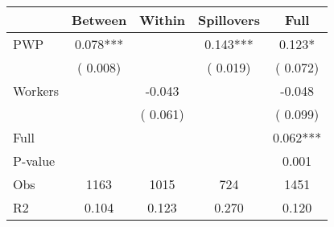
\begin{tabular}{l*{4}{c}}\hline&\multicolumn{1}{c}{Between}&\multicolumn{1}{c}{Within}&\multicolumn{1}{c}{Spillovers}&\multicolumn{1}{c}{Full}\\ \hline
 PWP           &              0.078***      &                                               &        0.143*** &         0.123*                            \\ 
                               &        (       0.008)           &                                       &       (       0.019)     &      (       0.072)                                           \\ 
 Workers       &                                               &       -0.043    &                                &            -0.048                            \\ 
                               &                                               & (       0.061)                  &                                        &      (       0.099)                                           \\ 
\hline                                                                                                                                                                                                                                            
 Full                  &                                               &                                               &                                        &             0.062***                                     \\ 
 P-value               &                                               &                                               &                                        &             0.001                                           \\ 
 Obs                   &               1163               &       1015                       &       724                &              1451                                               \\ 
 R2                    &                      0.104              &              0.123                      &              0.270               &                     0.120                                              \\ 
\hline \end{tabular}                                                                                                                                                                                                              